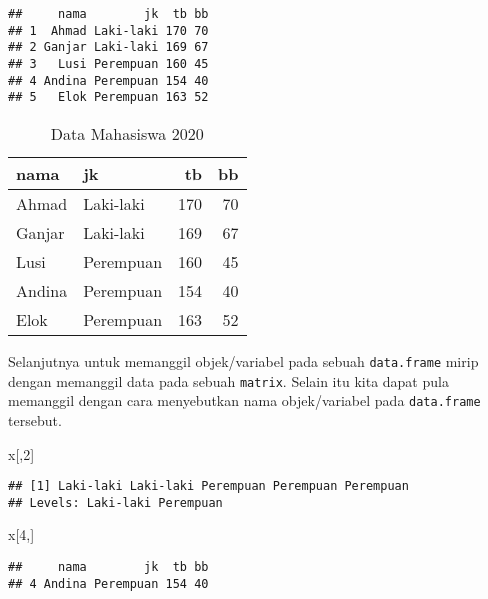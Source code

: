 \documentclass[
]{book}
\newenvironment{Shaded}{\begin{snugshade}}{\end{snugshade}}
\newcommand{\DecValTok}[1]{\textcolor[rgb]{0.00,0.00,0.81}{#1}}
\newcommand{\NormalTok}[1]{#1}
\newcommand{\OperatorTok}[1]{\textcolor[rgb]{0.81,0.36,0.00}{\textbf{#1}}}
\begin{document}
\begin{verbatim}
##     nama        jk  tb bb
## 1  Ahmad Laki-laki 170 70
## 2 Ganjar Laki-laki 169 67
## 3   Lusi Perempuan 160 45
## 4 Andina Perempuan 154 40
## 5   Elok Perempuan 163 52
\end{verbatim}

\begin{table}

\caption{\label{tab:unnamed-chunk-21}Data Mahasiswa 2020}
\centering
\begin{tabular}[t]{llrr}
\toprule
nama & jk & tb & bb\\
\midrule
Ahmad & Laki-laki & 170 & 70\\
Ganjar & Laki-laki & 169 & 67\\
Lusi & Perempuan & 160 & 45\\
Andina & Perempuan & 154 & 40\\
Elok & Perempuan & 163 & 52\\
\bottomrule
\end{tabular}
\end{table}

Selanjutnya untuk memanggil objek/variabel pada sebuah \texttt{data.frame} mirip dengan memanggil data pada sebuah \texttt{matrix}. Selain itu kita dapat pula memanggil dengan cara menyebutkan nama objek/variabel pada \texttt{data.frame} tersebut.

\begin{Shaded}
\begin{Highlighting}[]
\NormalTok{x[,}\DecValTok{2}\NormalTok{]}
\end{Highlighting}
\end{Shaded}

\begin{verbatim}
## [1] Laki-laki Laki-laki Perempuan Perempuan Perempuan
## Levels: Laki-laki Perempuan
\end{verbatim}

\begin{Shaded}
\begin{Highlighting}[]
\NormalTok{x[}\DecValTok{4}\NormalTok{,]}
\end{Highlighting}
\end{Shaded}

\begin{verbatim}
##     nama        jk  tb bb
## 4 Andina Perempuan 154 40
\end{verbatim}

\begin{Shaded}
\end{Shaded}
\end{document}
